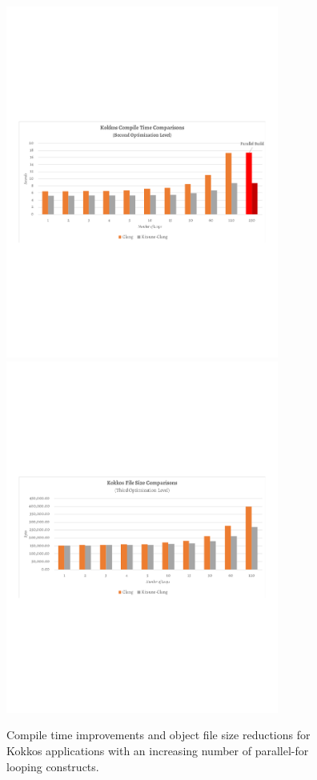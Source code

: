 \begin{figure}
  \includegraphics[width=0.8\textwidth]{projects/2.3.6-NNSA/2.3.6.01-LANL-ATDM/kokkos-compile-times.png}
  \includegraphics[width=0.8\textwidth]{projects/2.3.6-NNSA/2.3.6.01-LANL-ATDM/kokkos-file-size.png}
  \caption{Compile time improvements and object file size reductions for
           Kokkos applications with an increasing number of parallel-for
           looping constructs.}
  \label{fig:2.3.2.02:time_size}                      
\end{figure}


